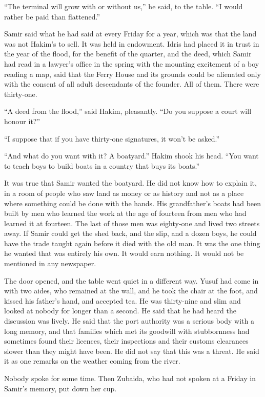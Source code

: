 ``The terminal will grow with or without us,'' he said, to the table. ``I would rather be paid than flattened.''

Samir said what he had said at every Friday for a year, which was that the land was not Hakim's to sell. It was held in endowment. Idris had placed it in trust in the year of the flood, for the benefit of the quarter, and the deed, which Samir had read in a lawyer's office in the spring with the mounting excitement of a boy reading a map, said that the Ferry House and its grounds could be alienated only with the consent of all adult descendants of the founder. All of them. There were thirty-one.

``A deed from the flood,'' said Hakim, pleasantly. ``Do you suppose a court will honour it?''

``I suppose that if you have thirty-one signatures, it won't be asked.''

``And what do you want with it? A boatyard.'' Hakim shook his head. ``You want to teach boys to build boats in a country that buys its boats.''

It was true that Samir wanted the boatyard. He did not know how to explain it, in a room of people who saw land as money or as history and not as a place where something could be done with the hands. His grandfather's boats had been built by men who learned the work at the age of fourteen from men who had learned it at fourteen. The last of those men was eighty-one and lived two streets away. If Samir could get the shed back, and the slip, and a dozen boys, he could have the trade taught again before it died with the old man. It was the one thing he wanted that was entirely his own. It would earn nothing. It would not be mentioned in any newspaper.

The door opened, and the table went quiet in a different way. Yusuf had come in with two aides, who remained at the wall, and he took the chair at the foot, and kissed his father's hand, and accepted tea. He was thirty-nine and slim and looked at nobody for longer than a second. He said that he had heard the discussion was lively. He said that the port authority was a serious body with a long memory, and that families which met its goodwill with stubbornness had sometimes found their licences, their inspections and their customs clearances slower than they might have been. He did not say that this was a threat. He said it as one remarks on the weather coming from the river.

Nobody spoke for some time. Then Zubaida, who had not spoken at a Friday in Samir's memory, put down her cup.

